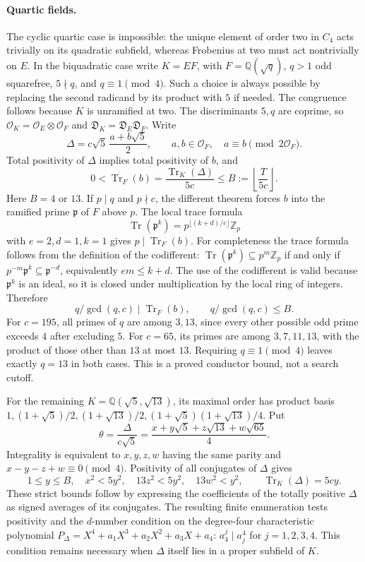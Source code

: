\paragraph{Quartic fields.}
The cyclic quartic case is impossible: the unique element of order two
in $C_4$ acts trivially on its quadratic subfield, whereas Frobenius at
two must act nontrivially on $E$.
In the biquadratic case write $K=E F$, with
$F=\mathbb Q(\sqrt q)$, $q>1$ odd squarefree, $5\nmid q$, and
$q\equiv1\pmod4$. Such a choice is always possible by replacing the
second radicand by its product with $5$ if needed. The congruence follows
because $K$ is unramified at two. The discriminants $5,q$ are coprime,
so $\mathcal O_K=\mathcal O_E\otimes\mathcal O_F$ and
$\mathfrak D_K=\mathfrak D_E\mathfrak D_F$.
Write
\[
 \Delta=c\sqrt5\,\frac{a+b\sqrt5}{2},\qquad
 a,b\in\mathcal O_F,\quad a\equiv b\pmod{2\mathcal O_F}.
\]
Total positivity of $\Delta$ implies total positivity of $b$, and
\[
 0<\operatorname{Tr}_F(b)
 =\frac{\operatorname{Tr}_K(\Delta)}{5c}\le B:=\left\lfloor\frac T{5c}\right\rfloor.
\]
Here $B=4$ or $13$. If $p\mid q$ and $p\nmid c$, the different theorem
forces $b$ into the ramified prime $\mathfrak p$ of $F$ above $p$.
The local trace formula
\[
 \operatorname{Tr}(\mathfrak p^k)
 =p^{\lfloor(k+d)/e\rfloor}\mathbb Z_p
\]
with $e=2,d=1,k=1$ gives $p\mid\operatorname{Tr}_F(b)$.
For completeness the trace formula follows from the definition of the
codifferent: $\operatorname{Tr}(\mathfrak p^k)\subseteq p^m\mathbb Z_p$
if and only if $p^{-m}\mathfrak p^k\subseteq\mathfrak p^{-d}$,
equivalently $em\le k+d$. The use of the codifferent is valid because
$\mathfrak p^k$ is an ideal, so it is closed under multiplication by the
local ring of integers.
Therefore
\[
 q/\gcd(q,c)\mid\operatorname{Tr}_F(b),\qquad q/\gcd(q,c)\le B.
\]
For $c=195$, all primes of $q$ are among $3,13$, since every other
possible odd prime exceeds $4$ after excluding $5$.
For $c=65$, its primes are among $3,7,11,13$, with the product of those
other than $13$ at most $13$. Requiring $q\equiv1\pmod4$ leaves exactly
$q=13$ in both cases. This is a proved conductor bound, not a search cutoff.

For the remaining $K=\mathbb Q(\sqrt5,\sqrt{13})$, its maximal order has
product basis $1,(1+\sqrt5)/2,(1+\sqrt{13})/2,(1+\sqrt5)(1+\sqrt{13})/4$.
Put
\[
 \theta=\frac\Delta{c\sqrt5}
 =\frac{x+y\sqrt5+z\sqrt{13}+w\sqrt{65}}4.
\]
Integrality is equivalent to
$x,y,z,w$ having the same parity and $x-y-z+w\equiv0\pmod4$.
Positivity of all conjugates of $\Delta$ gives
\[
 1\le y\le B,\quad x^2<5y^2,\quad13z^2<5y^2,\quad13w^2<y^2,
 \qquad\operatorname{Tr}_K(\Delta)=5cy.
\]
These strict bounds follow by expressing the coefficients of the totally
positive $\Delta$ as signed averages of its conjugates.
The resulting finite enumeration tests positivity and the $d$-number
condition on the degree-four characteristic polynomial
$P_\Delta=X^4+a_1X^3+a_2X^2+a_3X+a_4$:
$a_4^j\mid a_j^4$ for $j=1,2,3,4$. This condition remains necessary when
$\Delta$ itself lies in a proper subfield of $K$.

